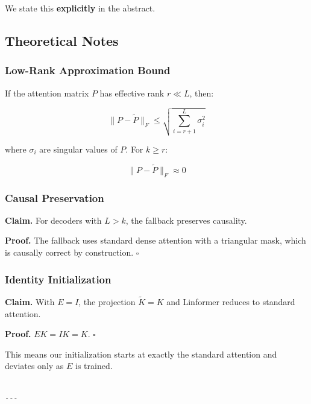 We state this \textbf{explicitly} in the abstract.

\subsection{Theoretical Notes}

\subsubsection{Low-Rank Approximation Bound}

If the attention matrix $P$ has effective rank $r \ll L$, then:

\[
\|P - \tilde{P}\|_F \leq \sqrt{\sum_{i=r+1}^L \sigma_i^2}
\tag{4.4}
\]

where $\sigma_i$ are singular values of $P$. For $k \geq r$:

\[
\|P - \tilde{P}\|_F \approx 0
\tag{4.5}
\]

\subsubsection{Causal Preservation}

\textbf{Claim.} For decoders with $L > k$, the fallback preserves causality.

\textbf{Proof.} The fallback uses standard dense attention with a triangular mask, 
which is causally correct by construction. $\square$

\subsubsection{Identity Initialization}

\textbf{Claim.} With $E = I$, the projection $\tilde{K} = K$ and Linformer 
reduces to standard attention.

\textbf{Proof.} $E K = I K = K$. $\square$

This means our initialization starts at exactly the standard attention and 
deviates only as $E$ is trained.
\begin{lstlisting}

---
\end{lstlisting}